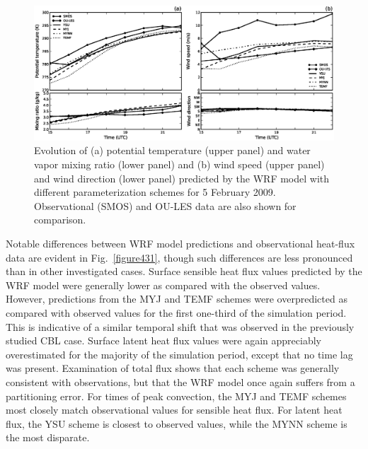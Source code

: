 \begin{figure}[ht!]
\begin{center}
\includegraphics[width=\textwidth]{figures/chapter4/meteogram_phys_20090205}
\end{center}
\caption{Evolution of (a) potential temperature (upper panel) and water vapor mixing ratio (lower panel) and (b) wind speed (upper panel) and wind direction (lower panel) predicted by the WRF model with different parameterization schemes for 5 February 2009. Observational (SMOS) and OU-LES data are also shown for comparison.}
\label{figure430}
\end{figure}


Notable differences between WRF model predictions and observational heat-flux data are evident in Fig.~\ref{figure431}, though such differences are less pronounced than in other investigated cases. Surface sensible heat flux values predicted by the WRF model were generally lower as compared with the observed values. However, predictions from the MYJ and TEMF schemes were overpredicted as compared with observed values for the first one-third of the simulation period. This is indicative of a similar temporal shift that was observed in the previously studied CBL case. Surface latent heat flux values were again appreciably overestimated for the majority of the simulation period, except that no time lag was present. Examination of total flux shows that each scheme was generally consistent with observations, but that the WRF model once again suffers from a partitioning error. For times of peak convection, the MYJ and TEMF schemes most closely match observational values for sensible heat flux. For latent heat flux, the YSU scheme is closest to observed values, while the MYNN scheme is the most disparate. 



